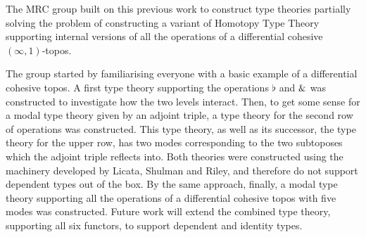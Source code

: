 \documentclass[a4paper,12pt]{article}
\begin{document}
The MRC group built on this previous work to construct type theories partially solving the problem of constructing a variant of Homotopy Type Theory
supporting internal versions of all the operations of a differential cohesive $(\infty,1)$-topos.

The group started by familiarising everyone with a basic example of a differential cohesive topos. 
A first type theory supporting the operations $\flat$ and $\&$ was constructed to investigate how the two levels interact.
Then, to get some sense for a modal type theory given by an adjoint triple, a type theory for the second row of operations was constructed.
This type theory, as well as its successor, the type theory for the upper row, has two modes corresponding to the two subtoposes which the adjoint triple reflects into. 
Both theories were constructed using the machinery developed by Licata, Shulman and Riley, and therefore do not support dependent types out of the box.
By the same approach, finally, a modal type theory supporting all the operations of a differential cohesive topos with five modes was constructed.
Future work will extend the combined type theory, supporting all six functors, to support dependent and identity types.
\end{document}
